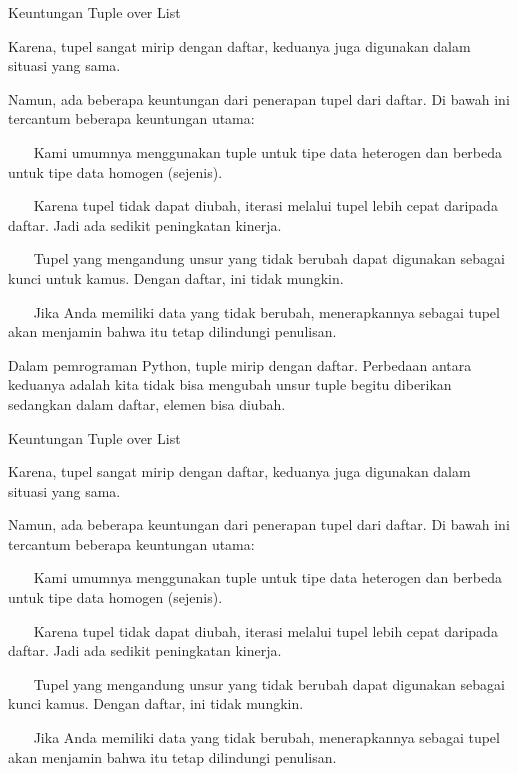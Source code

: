 Keuntungan Tuple over List \par
\vspace{12pt}
Karena, tupel sangat mirip dengan daftar, keduanya juga digunakan dalam situasi yang sama. \par
\vspace{12pt}
Namun, ada beberapa keuntungan dari penerapan tupel dari daftar. Di bawah ini tercantum beberapa keuntungan utama: \par
\vspace{12pt}
~~~ Kami umumnya menggunakan tuple untuk tipe data heterogen dan berbeda untuk tipe data homogen (sejenis). \par
~~~ Karena tupel tidak dapat diubah, iterasi melalui tupel lebih cepat daripada daftar. Jadi ada sedikit peningkatan kinerja. \par
~~~ Tupel yang mengandung unsur yang tidak berubah dapat digunakan sebagai kunci untuk kamus. Dengan daftar, ini tidak mungkin. \par
~~~ Jika Anda memiliki data yang tidak berubah, menerapkannya sebagai tupel akan menjamin bahwa itu tetap dilindungi penulisan. \par
\vspace{12pt}
Dalam pemrograman Python, tuple mirip dengan daftar. Perbedaan antara keduanya adalah kita tidak bisa mengubah unsur tuple begitu diberikan sedangkan dalam daftar, elemen bisa diubah. \par
Keuntungan Tuple over List \par
\vspace{12pt}
Karena, tupel sangat mirip dengan daftar, keduanya juga digunakan dalam situasi yang sama. \par
\vspace{12pt}
Namun, ada beberapa keuntungan dari penerapan tupel dari daftar. Di bawah ini tercantum beberapa keuntungan utama: \par
\vspace{12pt}
~~~ Kami umumnya menggunakan tuple untuk tipe data heterogen dan berbeda untuk tipe data homogen (sejenis). \par
~~~ Karena tupel tidak dapat diubah, iterasi melalui tupel lebih cepat daripada daftar. Jadi ada sedikit peningkatan kinerja. \par
~~~ Tupel yang mengandung unsur yang tidak berubah dapat digunakan sebagai kunci kamus. Dengan daftar, ini tidak mungkin. \par
~~~ Jika Anda memiliki data yang tidak berubah, menerapkannya sebagai tupel akan menjamin bahwa itu tetap dilindungi penulisan. \par
